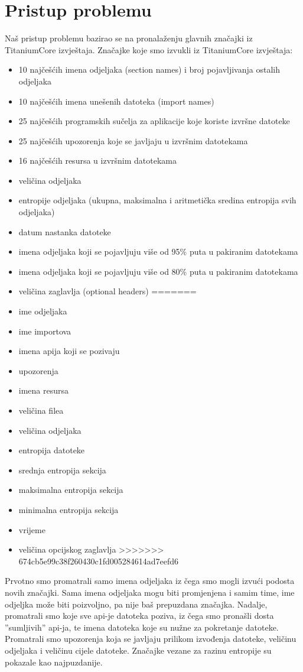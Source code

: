 \documentclass[conference]{IEEEtran}
\begin{document}
\section{Pristup problemu}
Naš pristup problemu bazirao se na pronalaženju glavnih značajki iz TitaniumCore izvještaja.
Značajke koje smo izvukli iz TitaniumCore izvještaja:
\begin{itemize}
<<<<<<< HEAD
\item 10 najčešćih imena odjeljaka (section names) i broj pojavljivanja ostalih odjeljaka
\item 10 najčešćih imena unešenih datoteka (import names)
\item 25 najčešćih programskih sučelja za aplikacije koje koriste izvršne datoteke
\item 25 najčešćih upozorenja koje se javljaju u izvršnim datotekama
\item 16 najčešćih resursa u izvršnim datotekama
\item veličina odjeljaka
\item entropije odjeljaka (ukupna, maksimalna i aritmetička sredina entropija svih odjeljaka)\cite{b1}
\item datum nastanka datoteke
\item imena odjeljaka koji se pojavljuju više od 95\% puta u pakiranim datotekama
\item imena odjeljaka koji se pojavljuju više od 80\% puta u pakiranim datotekama
\item veličina zaglavlja (optional headers)
=======
\item  ime odjeljaka
\item	ime importova
\item 	imena apija koji se pozivaju
\item	upozorenja
\item 	imena resursa
\item	veličina filea
\item	veličina odjeljaka 
\item	entropija datoteke
\item 	srednja entropija sekcija
\item	maksimalna entropija sekcija
\item 	minimalna entropija sekcija
\item	vrijeme
\item	veličina opcijskog zaglavlja
>>>>>>> 674cb5e99c38f260430c1fd005284614ad7eefd6
\end{itemize}
Prvotno smo promatrali samo imena odjeljaka iz čega smo mogli izvući podosta novih značajki. Sama imena odjeljaka mogu biti promjenjena i samim time, ime odjeljka može biti poizvoljno, pa nije baš prepuzdana značajka. Nadalje, promatrali smo koje sve api-je datoteka poziva, iz čega smo pronašli dosta ''sumljivih'' api-ja, te imena datoteka koje su nužne za pokretanje datoteke.  Promatrali smo upozorenja koja se javljaju prilikom izvođenja datoteke, veličinu odjeljaka i veličinu cijele datoteke.
Značajke vezane za razinu entropije su pokazale kao najpuzdanije.
\end{document}
